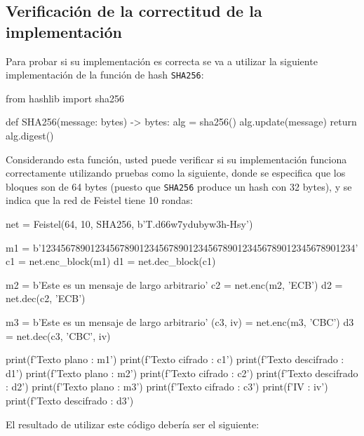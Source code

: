 \subsection*{Verificación de la correctitud de la implementación}
Para probar si su implementación es correcta se va a utilizar la siguiente implementación de la función de hash \texttt{SHA256}:
\begin{python}
from hashlib import sha256

def SHA256(message: bytes) -> bytes:
    alg = sha256()
    alg.update(message)
    return alg.digest()
\end{python}
Considerando esta función, usted puede verificar si su implementación funciona correctamente utilizando pruebas como la siguiente, donde se especifica que los bloques son de 64 bytes (puesto que \texttt{SHA256} produce un hash con 32 bytes), y se indica que la red de Feistel tiene 10 rondas:
\begin{python}
net = Feistel(64, 10, SHA256, b'T.d66w7ydubyw3h-Hsy')

m1 = b'1234567890123456789012345678901234567890123456789012345678901234'
c1 = net.enc_block(m1)
d1 = net.dec_block(c1)

m2 = b'Este es un mensaje de largo arbitrario'
c2 = net.enc(m2, 'ECB')
d2 = net.dec(c2, 'ECB')

m3 = b'Este es un mensaje de largo arbitrario'
(c3, iv) = net.enc(m3, 'CBC')
d3 = net.dec(c3, 'CBC', iv)

print(f'Texto plano      : {m1}')
print(f'Texto cifrado    : {c1}')
print(f'Texto descifrado : {d1}\n')
print(f'Texto plano      : {m2}')
print(f'Texto cifrado    : {c2}')
print(f'Texto descifrado : {d2}\n')
print(f'Texto plano      : {m3}')
print(f'Texto cifrado    : {c3}')
print(f'IV               : {iv}')
print(f'Texto descifrado : {d3}')
\end{python}
El resultado de utilizar este código debería ser el siguiente:
